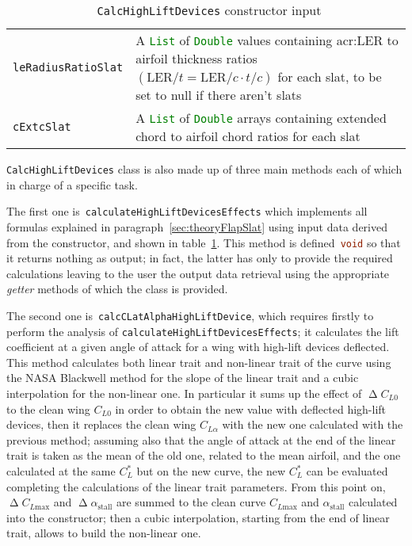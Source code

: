 \begin{table}[!b]
{\begin{tabular}{p{0.2\linewidth}p{0.8\linewidth}}
\lstinline[language=Java]!leRadiusRatioSlat! & A \lstinline[language=Java]!List! of  \lstinline[language=Java]!Double! values containing \gls{acr:LER} to airfoil thickness ratios $\left(\text{LER}/t=\text{LER}/c\cdot t/c\right)$ for each slat, to be set to null if there aren't slats \\  [0.2cm]
\lstinline[language=Java]!cExtcSlat! & A \lstinline[language=Java]!List! of  \lstinline[language=Java]!Double! arrays containing extended chord to airfoil chord ratios for each slat \\ 
\bottomrule
\end{tabular}
}
\caption{~\lstinline[language=Java]!CalcHighLiftDevices! constructor input}
\label{table:CalcHighLiftConstructor}
\end{table}
%
\lstinline[language=Java]!CalcHighLiftDevices! class is also made up of three main methods each of which in charge of a specific task. 

\bigskip
\noindent
The first one is~\lstinline[language=Java]!calculateHighLiftDevicesEffects! which implements all formulas explained in paragraph~\ref{sec:theoryFlapSlat} using input data derived from the constructor, and shown in table~\ref{table:CalcHighLiftConstructor}. This method is defined~\lstinline[language=Java]!void! so that it returns nothing as output; in fact, the latter has only to provide the required calculations leaving to the user the output data retrieval using the appropriate \emph{getter} methods of which the class is provided. 

\bigskip
\noindent
The second one is~\lstinline[language=Java]!calcCLatAlphaHighLiftDevice!, which requires firstly to perform the analysis of \lstinline[language=Java]!calculateHighLiftDevicesEffects!; it calculates the lift coefficient at a given angle of attack for a wing with high-lift devices deflected. This method calculates both linear trait and non-linear trait of the curve using the NASA Blackwell method for the slope of the linear trait and a cubic interpolation for the non-linear one. 
%
In particular it sums up the effect of $\upDelta C_{L0}$ to the clean wing $C_{L0}$ in order to obtain the new value with deflected high-lift devices, then it replaces the clean wing $C_{L\alpha}$ with the new one calculated with the previous method; assuming also that the angle of attack at the end of the linear trait is taken as the mean of the old one, related to the mean airfoil, and the one calculated at the same $C_L^*$ but on the new curve, the new $C_L^*$  can be evaluated completing the calculations of the linear trait parameters. From this point on, $\upDelta C_{L\text{max}}$ and $\upDelta\alpha_{\text{stall}}$ are summed to the clean curve $C_{L\text{max}}$ and $\alpha_{\text{stall}}$ calculated into the constructor; then a cubic interpolation, starting from the end of linear trait, allows to build the non-linear one.

